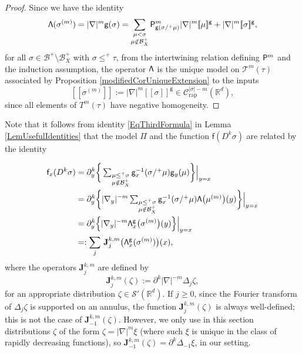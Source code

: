 \documentclass[10pt]{amsart}
\theoremstyle{plain}
\theoremstyle{definition}
\newcommand{\Brac}[1]{[\![#1]\!]}
\newcommand{\rap}{\mathrm{rap}}
\newcommand{\bfJ}{\mathbf{J}}
\newcommand{\sfP}{\mathsf{P}}
\newcommand{\sff}{\mathsf{f}}
\newcommand{\sfg}{\mathsf{g}}
\newcommand{\sfPi}{\mathsf{\Pi}}
\newcommand{\scrT}{\mathscr{T}}
\newcommand{\bbR}{\mathbb{R}}
\newcommand{\mcB}{\mathcal{B}}
\newcommand{\mcC}{\mathcal{C}}
\newcommand\mcS{\mathcal{S}}
\begin{document}
\begin{proof}
Since we have the identity
\[
{\sf\Lambda}(\sigma^{(m)}) = |\nabla|^m\sfg(\sigma) = \sum_{\substack{\mu<\sigma\\\mu\notin\mcB_X^+}}\sfP^m_{\sfg(\sigma/^+\mu)}|\nabla|^m \Brac{\mu}^\sfg + |\nabla|^m\Brac{\sigma}^\sfg,
\]
for all $\sigma\in\mcB^+\setminus\mcB_X^+$ with $\sigma\le^+\tau$, from the intertwining relation defining ${\sf P}^m$ and the induction assumption, the operator $\sf\Lambda$ is the unique model on $\scrT^m(\tau)$ associated by Proposition \ref{modifiedCorUniqueExtension} to the inputs
\[
\Brac{\sigma^{(m)}}:=|\nabla|^m\Brac{\sigma}^\sfg\in \mcC_\rap^{|\sigma|-m}(\bbR^d),
\]
since all elements of $T^m(\tau)$ have negative homogeneity.
\end{proof}

Note that it follows from identity \eqref{EqThirdFormula} in Lemma \ref{LemUsefulIdentities} that the model $\sfPi$ and the function $\sff(D^k\sigma)$ are related by the identity

\begin{equation} \label{formula:f_xD^k}
\begin{split}
\sff_x(D^k\sigma) &= \partial_y^k\bigg\{\textstyle\sum_{\substack{\mu\leq^+\sigma\\\mu\notin\mcB_X^+}}\sfg_x^{-1}(\sigma/^+\mu)\sfg_y(\mu)\bigg\}\Big|_{y=x} \\
&= \partial_y^k\bigg\{|\nabla_y|^{-m} \textstyle\sum_{\substack{\mu\leq^+\sigma\\\mu\notin\mcB_X^+}}\sfg_x^{-1}(\sigma/^+\mu) {\sf\Lambda}\bigl(\mu^{(m)}\bigr)(y)\bigg\}\Big|_{y=x} \\
&= \partial_y^k\Bigl\{|\nabla_y|^{-m} {\sf\Lambda}^{\sfg}_x\bigl(\sigma^{(m)}\bigr)(y)\Bigr\}\Big|_{y=x} \\
&=: \sum_j\, \bfJ_j^{k,m}\bigl({\sf\Lambda}^{\sfg}_x(\sigma^{(m)})\bigr)(x),
\end{split}
\end{equation}
where the operators $\bfJ_j^{k,m}$ are defined by
\[
\bfJ_j^{k,m}(\zeta) := \partial^k|\nabla|^{-m}\Delta_j\zeta,
\]
for an appropriate distribution $\zeta\in\mcS'(\bbR^d)$. If $j\ge0$, since the Fourier transform of $\Delta_j\zeta$ is supported on an annulus, the function $\bfJ_j^{k,m}(\zeta)$ is always well-defined; this is not the case of $\bfJ_{-1}^{k,m}(\zeta)$. However, we only use in this section distributions $\zeta$ of the form $\zeta=|\nabla|^m\xi$ (where such $\xi$ is unique in the class of rapidly decreasing functions), so $\bfJ_{-1}^{k,m}(\zeta)=\partial^k\Delta_{-1}\xi$, in our setting.
\end{document}
